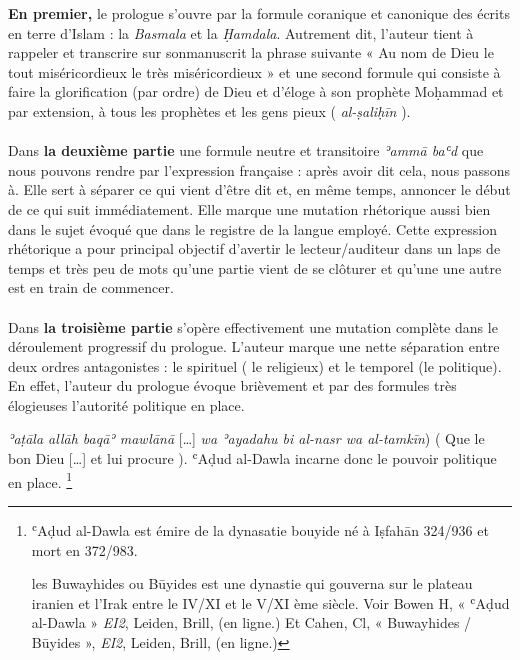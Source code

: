 \documentclass[a4paper,12pt]{report}
\begin{document}
\begin{itemize}
\begin{enumerate}
\textbf{En premier,} le prologue s’ouvre  par  la formule  coranique et canonique des écrits en terre d’Islam : la \textit{Basmala} et la \textit{Ḥamdala}. Autrement dit, l’auteur tient à rappeler  et transcrire sur sonmanuscrit la phrase suivante «  Au nom de Dieu le tout miséricordieux le très miséricordieux »  et une  second formule  qui consiste à faire la glorification (par ordre) de Dieu et  d’éloge à son prophète Moḥammad et par extension, à tous les prophètes et les gens pieux ( \textit{al-ṣaliḥīn} ). 
\paragraph{}
Dans \textbf{la deuxième partie} une formule  neutre et transitoire  \textit{ʾammā baʿd } que nous pouvons rendre par  l’expression française :  après avoir dit cela, nous passons à. Elle sert à séparer ce qui vient d’être dit et, en même temps, annoncer le début de ce  qui  suit immédiatement. Elle marque  une mutation rhétorique aussi bien dans le sujet évoqué que dans le registre de la langue employé. Cette expression rhétorique a  pour principal objectif d’avertir le lecteur/auditeur dans un laps de temps et très peu de mots  qu’une  partie vient de  se clôturer et qu’une une autre  est en train de commencer. 
\paragraph{}
Dans \textbf{la troisième partie} s’opère effectivement une mutation complète dans le déroulement progressif du prologue. L’auteur  marque une nette séparation entre deux ordres antagonistes : le spirituel ( le religieux)  et le temporel  (le politique). En effet,  l'auteur du prologue évoque brièvement et par des formules très élogieuses l'autorité politique en place.
  
\textit{ʾaṭāla allāh baqāʾ mawlānā} […] \textit{wa ʾayadahu bi al-nasr wa al-tamkīn}) 
( Que le bon Dieu  […] et lui procure   ).   ʿAḍud al-Dawla  incarne donc le pouvoir politique en place. \footnote{ʿAḍud al-Dawla est émire de la dynasatie bouyide né à Iṣfahān 324/936 et mort en 372/983.

les Buwayhides ou Būyides est une dynastie qui gouverna sur le plateau iranien et l'Irak entre le IV/XI  et le V/XI ème siècle. 
Voir Bowen H, « ʿAḍud al-Dawla » \textit{ EI2}, Leiden, Brill, (en ligne.) Et 
Cahen, Cl, « Buwayhides / Būyides », \textit{ EI2}, Leiden, Brill, (en ligne.)}   


\end{enumerate}
\end{itemize}
\end{document}
